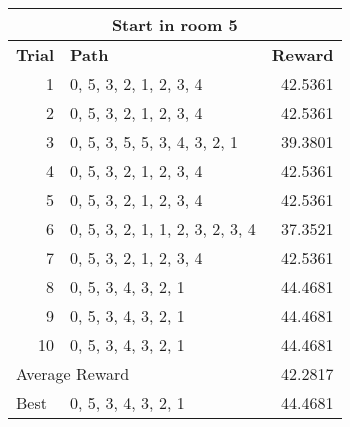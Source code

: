 \documentclass[../Head/Main.tex]{subfiles}
\begin{document}
\begin{tabular}{r l r}
	\hline
	\multicolumn{3}{c}{\textbf{\large Start in room 5}} \\
	\hline 
	\multicolumn{1}{l}{\textbf{Trial}} & \textbf{Path} & \textbf{Reward} \\ 			\hline
	1  & 0, 5, 3, 2, 1, 2, 3, 4           & 42.5361\\
	2  & 0, 5, 3, 2, 1, 2, 3, 4           & 42.5361\\
	3  & 0, 5, 3, 5, 5, 3, 4, 3, 2, 1     & 39.3801\\
	4  & 0, 5, 3, 2, 1, 2, 3, 4           & 42.5361\\
	5  & 0, 5, 3, 2, 1, 2, 3, 4           & 42.5361\\
	6  & 0, 5, 3, 2, 1, 1, 2, 3, 2, 3, 4  & 37.3521\\
	7  & 0, 5, 3, 2, 1, 2, 3, 4           & 42.5361\\
	8  & 0, 5, 3, 4, 3, 2, 1              & 44.4681\\
	9  & 0, 5, 3, 4, 3, 2, 1              & 44.4681\\
	10 & 0, 5, 3, 4, 3, 2, 1              & 44.4681\\
	\hline
	\multicolumn{2}{l}{Average Reward} & 42.2817\\
	\hline	
	\multicolumn{1}{l}{Best} & 0, 5, 3, 4, 3, 2, 1 & 44.4681\\
	\hline
\end{tabular}
\end{document}
